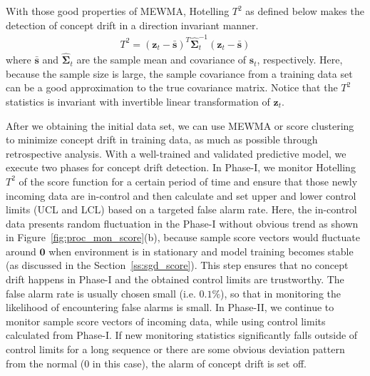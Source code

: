 \documentclass[twoside,11pt]{article}
\begin{document}
With those good properties of MEWMA, Hotelling $T^2$ as defined below makes the detection of concept drift in a direction invariant manner.
\begin{align}
T^2 = (\bm {z}_t-\bar { \bm {s}})^T \hat {\bm { \Sigma}} ^{-1}_{t}(\bm {z}_t-\bar { \bm {s}})
\label{eqn:hotellingt2}
\end{align}
where $\bar {\bm{s}}$ and $\hat {\bm {\Sigma}} _{t}$ are the sample mean and covariance of $\bm {s}_t$, respectively. Here, because the sample size is large, the sample covariance from a training data set can be a good approximation to the true covariance matrix. Notice that the $T^2$ statistics is invariant with invertible linear transformation of $\bm {z}_t$. 

After we obtaining the initial data set, we can use MEWMA or score clustering to minimize concept drift in training data, as much as possible through retrospective analysis. With a well-trained and validated predictive model, we execute two phases for concept drift detection. In Phase-I, we {monitor Hotelling $T^2$ of the score function for a certain period of time and ensure that those newly incoming data are in-control and} then calculate and set {upper and lower} control limits {(UCL and LCL)} based on a targeted false alarm rate. Here, the in-control data presents random fluctuation in the Phase-I without obvious trend as shown in Figure~\ref{fig:proc_mon_score}(b), because sample score vectors would fluctuate around $\bm {0}$ when environment is in stationary and model training becomes stable (as discussed in the Section~\ref{ss:sgd_score}). This step ensures that no concept drift happens in Phase-I and the obtained control limits are trustworthy. The false alarm rate is usually chosen small (i.e. $0.1\%$), so that in monitoring the likelihood of encountering false alarms is small. In Phase-II, we continue to monitor sample score vectors of incoming data, while using control limits calculated from Phase-I. If new {monitoring statistics} significantly falls outside of control limits for a long sequence or there are some obvious deviation pattern from the normal ($0$ in this case), the alarm of concept drift is set off.
\end{document}
